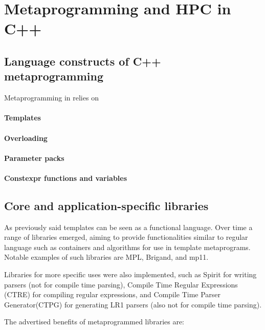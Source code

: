 \documentclass[../../main.tex]{subfiles}
\begin{document}
\section{Metaprogramming and HPC in C++} \label{lbl:meta-cpp}

\subsection{Language constructs of C++ metaprogramming}

Metaprogramming in \cpp relies on

\paragraph{Templates}

\paragraph{Overloading}

\paragraph{Parameter packs}

\paragraph{Constexpr functions and variables}

\subsection{Core and application-specific libraries}

As previously said \cpp templates can be seen as a functional language.
Over time a range of libraries emerged, aiming to provide functionalities
similar to regular language such as containers and algorithms for use in
template metaprograms. Notable examples of such libraries are MPL\cite{mpl},
Brigand\cite{brigand}, and mp11\cite{mp11}.

Libraries for more specific uses were also implemented, such as
Spirit\cite{spirit} for writing parsers (not for compile time parsing),
Compile Time Regular Expressions (CTRE)\cite{ctre}
for compiling regular expressions,
and Compile Time Parser Generator(CTPG)\cite{ctpg}
for generating LR1 parsers (also not for compile time parsing).

The advertised benefits of metaprogrammed libraries are:
\end{document}
